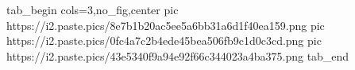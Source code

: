  
 
 
 
 
\zzSecCmtScr

\ifcmt
  tab_begin cols=3,no_fig,center
     pic https://i2.paste.pics/8e7b1b20ac5ee5a6bb31a6d1f40ea159.png
     pic https://i2.paste.pics/0fc4a7c2b4ede45bea506fb9c1d0c3cd.png
     pic https://i2.paste.pics/43e5340f9a94e92f66c344023a4ba375.png
  tab_end
\fi
